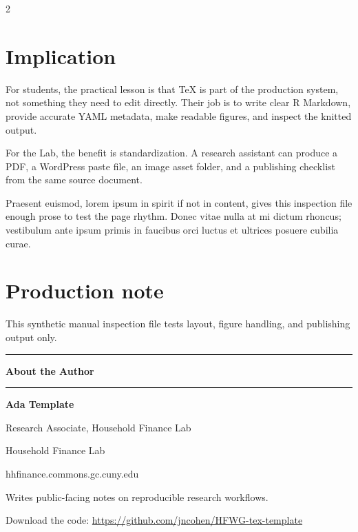 \documentclass[12pt]{article}
\begin{document}
\begin{paracol}{2}
\section{Implication}\label{implication}

For students, the practical lesson is that TeX is part of the production
system, not something they need to edit directly. Their job is to write
clear R Markdown, provide accurate YAML metadata, make readable figures,
and inspect the knitted output.

For the Lab, the benefit is standardization. A research assistant can
produce a PDF, a WordPress paste file, an image asset folder, and a
publishing checklist from the same source document.

Praesent euismod, lorem ipsum in spirit if not in content, gives this
inspection file enough prose to test the page rhythm. Donec vitae nulla
at mi dictum rhoncus; vestibulum ante ipsum primis in faucibus orci
luctus et ultrices posuere cubilia curae.

\section{Production note}\label{production-note}

This synthetic manual inspection file tests layout, figure handling, and
publishing output only.

\switchcolumn[1]
\vspace*{\fill}
\par\vspace{0.55em}
\noindent\textcolor{hfwgrule}{\rule{\linewidth}{0.45pt}}\par
\vspace{0.25em}
{\scriptsize\bfseries\color{hfwgaccent} About the Author}\par
\vspace{0.2em}
\begin{minipage}{\linewidth}
\scriptsize\singlespacing
\begin{minipage}[c]{0.20\linewidth}
\colorbox{hfwgaccent!10}{\rule{0pt}{0.58in}\rule{0.58in}{0pt}}
\end{minipage}\hfill
\begin{minipage}[c]{0.74\linewidth}
\textbf{Ada Template}\par
{Research Associate, Household Finance Lab}\par
{Household Finance Lab}\par
{\color{hfwgaccent}hhfinance.commons.gc.cuny.edu}\par
Writes public-facing notes on reproducible research workflows.
\end{minipage}
\end{minipage}\par
\vspace{0.35em}
{\scriptsize\singlespacing Download the code: {\color{hfwgaccent}\url{https://github.com/jncohen/HFWG-tex-template}}\par}
\end{paracol}
\end{document}
